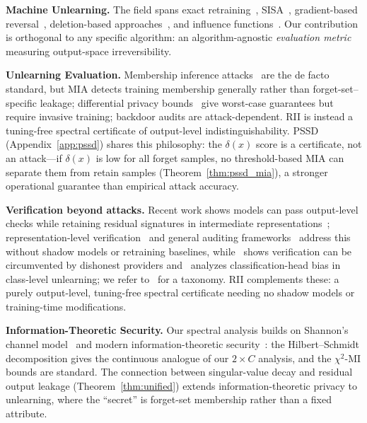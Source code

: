 \documentclass[smallextended]{svjour3}       %
\begin{document}
\textbf{Machine Unlearning.} The field spans exact retraining~\cite{cao2015towards}, SISA~\cite{bourtoule2021machine}, gradient-based reversal~\cite{golatkar2020eternal}, deletion-based approaches~\cite{ginart2019making,sekhari2021remember}, and influence functions~\cite{guo2020certified}. Our contribution is orthogonal to any specific algorithm: an algorithm-agnostic \emph{evaluation metric} measuring output-space irreversibility.

\textbf{Unlearning Evaluation.} Membership inference attacks~\cite{shokri2017membership,carlini2022membership} are the de facto standard, but MIA detects training membership generally rather than forget-set--specific leakage; differential privacy bounds~\cite{guo2020certified} give worst-case guarantees but require invasive training; backdoor audits are attack-dependent. RII is instead a tuning-free spectral certificate of output-level indistinguishability. PSSD (Appendix~\ref{app:pssd}) shares this philosophy: the $\delta(x)$ score is a certificate, not an attack---if $\delta(x)$ is low for all forget samples, no threshold-based MIA can separate them from retain samples (Theorem~\ref{thm:pssd_mia}), a stronger operational guarantee than empirical attack accuracy.

\textbf{Verification beyond attacks.} Recent work shows models can pass output-level checks while retaining residual signatures in intermediate representations~\cite{cosma2026ruler,yong2026erased}; representation-level verification~\cite{cosma2026ruler} and general auditing frameworks~\cite{ye2026auditing} address this without shadow models or retraining baselines, while~\cite{zhang2024fragile} shows verification can be circumvented by dishonest providers and~\cite{zheng2026bias} analyzes classification-head bias in class-level unlearning; we refer to~\cite{xue2026verification} for a taxonomy. RII complements these: a purely output-level, tuning-free spectral certificate needing no shadow models or training-time modifications.

\textbf{Information-Theoretic Security.} Our spectral analysis builds on Shannon's channel model~\cite{shannon1949communication} and modern information-theoretic security~\cite{bloch2021overview}: the Hilbert--Schmidt decomposition gives the continuous analogue of our $2\times C$ analysis, and the $\chi^2$-MI bounds are standard. The connection between singular-value decay and residual output leakage (Theorem~\ref{thm:unified}) extends information-theoretic privacy to unlearning, where the ``secret'' is forget-set membership rather than a fixed attribute.
\end{document}
